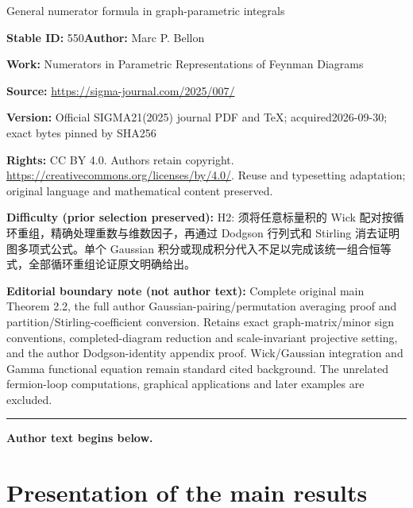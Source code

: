 \documentclass[11pt]{article}
\numberwithin{equation}{section}
\begin{document}
\begin{center}\Large General numerator formula in graph-parametric integrals\end{center}
\noindent\textbf{Stable ID:} 550\quad\textbf{Author:} Marc P. Bellon\par
\noindent\textbf{Work:} Numerators in Parametric Representations of Feynman Diagrams\par
\noindent\textbf{Source:} \url{https://sigma-journal.com/2025/007/}\par
\noindent\textbf{Version:} Official SIGMA21(2025) journal PDF and TeX; acquired2026-09-30; exact bytes pinned by SHA256\par
\noindent\textbf{Rights:} CC BY 4.0. Authors retain copyright. \url{https://creativecommons.org/licenses/by/4.0/}. Reuse and typesetting adaptation; original language and mathematical content preserved.\par
\noindent\textbf{Difficulty (prior selection preserved):} {\CJKfont H2: 须将任意标量积的 Wick 配对按循环重组，精确处理重数与维数因子，再通过 Dodgson 行列式和 Stirling 消去证明图多项式公式。单个 Gaussian 积分或现成积分代入不足以完成该统一组合恒等式，全部循环重组论证原文明确给出。}\par
\medskip\noindent\textbf{Editorial boundary note (not author text):} Complete original main Theorem 2.2, the full author Gaussian-pairing/permutation averaging proof and partition/Stirling-coefficient conversion. Retains exact graph-matrix/minor sign conventions, completed-diagram reduction and scale-invariant projective setting, and the author Dodgson-identity appendix proof. Wick/Gaussian integration and Gamma functional equation remain standard cited background. The unrelated fermion-loop computations, graphical applications and later examples are excluded.\par
\medskip\hrule\medskip\noindent\textbf{Author text begins below.}\par
\setcounter{section}{1}
\section{Presentation of the main results} \label{presentation}
\end{document}
